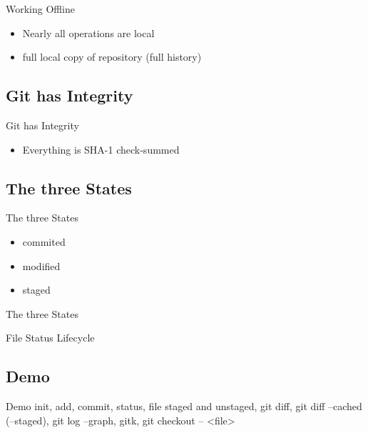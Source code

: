 \documentclass{beamer}
\begin{document}
\begin{frame}{Working Offline}
  \begin{itemize}
  \item
    Nearly all operations are local
  \item
    full local copy of repository (full history)
  \end{itemize}
\end{frame}

\subsection{Git has Integrity}

\begin{frame}{Git has Integrity}
  \begin{itemize}
  \item
    Everything is SHA-1 check-summed
  \end{itemize}
\end{frame}

\subsection{The three States}

\begin{frame}{The three States}
  \begin{itemize}
  \item
    commited
  \item
    modified
  \item
    staged
  \end{itemize}
\end{frame}

\begin{frame}{The three States}
    \centering
    \hfill\vfill
\end{frame}

\begin{frame}{File Status Lifecycle}
    \centering
    \hfill\vfill
\end{frame}

\subsection{Demo}

\begin{frame}{Demo}
 init, add, commit, status, file staged and unstaged, git diff, git diff --cached (--staged), git log --graph, gitk, git checkout -- <file>
\end{frame}
\end{document}
